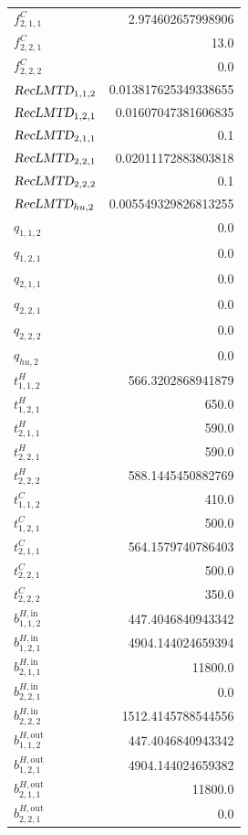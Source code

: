 \documentclass{article}%
\begin{document}
\begin{multicols*}{3}
\begin{supertabular}{lr}
	$f_{2,1,1}^{C}$ & 2.974602657998906 \\%
	$f_{2,2,1}^{C}$ & 13.0 \\%
	$f_{2,2,2}^{C}$ & 0.0 \\%
	$\textsl{RecLMTD}_{1,1,2}$ & 0.013817625349338655 \\%
	$\textsl{RecLMTD}_{1,2,1}$ & 0.01607047381606835 \\%
	$\textsl{RecLMTD}_{2,1,1}$ & 0.1 \\%
	$\textsl{RecLMTD}_{2,2,1}$ & 0.02011172883803818 \\%
	$\textsl{RecLMTD}_{2,2,2}$ & 0.1 \\%
	$\textsl{RecLMTD}_{hu,2}$ & 0.005549329826813255 \\%
	$q_{1,1,2}$ & 0.0 \\%
	$q_{1,2,1}$ & 0.0 \\%
	$q_{2,1,1}$ & 0.0 \\%
	$q_{2,2,1}$ & 0.0 \\%
	$q_{2,2,2}$ & 0.0 \\%
	$q_{hu,2}$ & 0.0 \\%
	$t_{1,1,2}^{H}$ & 566.3202868941879 \\%
	$t_{1,2,1}^{H}$ & 650.0 \\%
	$t_{2,1,1}^{H}$ & 590.0 \\%
	$t_{2,2,1}^{H}$ & 590.0 \\%
	$t_{2,2,2}^{H}$ & 588.1445450882769 \\%
	$t_{1,1,2}^{C}$ & 410.0 \\%
	$t_{1,2,1}^{C}$ & 500.0 \\%
	$t_{2,1,1}^{C}$ & 564.1579740786403 \\%
	$t_{2,2,1}^{C}$ & 500.0 \\%
	$t_{2,2,2}^{C}$ & 350.0 \\%
	$b_{1,1,2}^{H,\text{in}}$ & 447.4046840943342 \\%
	$b_{1,2,1}^{H,\text{in}}$ & 4904.144024659394 \\%
	$b_{2,1,1}^{H,\text{in}}$ & 11800.0 \\%
	$b_{2,2,1}^{H,\text{in}}$ & 0.0 \\%
	$b_{2,2,2}^{H,\text{in}}$ & 1512.4145788544556 \\%
	$b_{1,1,2}^{H,\text{out}}$ & 447.4046840943342 \\%
	$b_{1,2,1}^{H,\text{out}}$ & 4904.144024659382 \\%
	$b_{2,1,1}^{H,\text{out}}$ & 11800.0 \\%
	$b_{2,2,1}^{H,\text{out}}$ & 0.0 \\%

\end{supertabular}
\end{multicols*}
\end{document}
